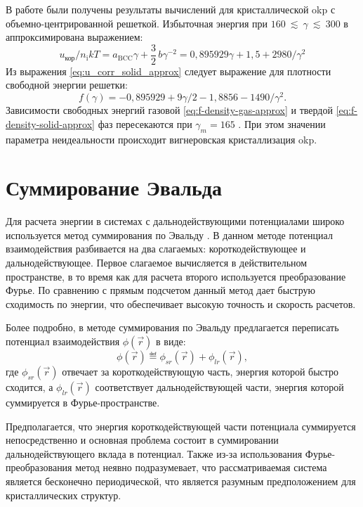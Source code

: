 В работе \cite{Slattery:u_corr_approximation} были получены результаты вычислений для кристаллической \acrshort{okp} с объемно-центрированной решеткой. Избыточная энергия при $160~\lesssim~\gamma~\lesssim~300$ в \cite{Slattery:u_corr_approximation} аппроксимирована выражением:
\begin{equation}
    \label{eq:u_corr_solid_approx}
    u_{\text{кор}} / n_{\mathrm{i}} k T=a_{\mathrm{BCC}} \gamma+\frac{3}{2}\, b \gamma^{-2}=0,895929 \gamma+1,5+2980 / \gamma^{2}
\end{equation}
Из выражения \eqref{eq:u_corr_solid_approx} следует выражение для плотности свободной энергии решетки:
\begin{equation}
    \label{eq:f-density-solid-approx}
    f(\gamma)=-0,895929+9 \gamma / 2-1,8856-1490 / \gamma^{2}.
\end{equation}
Зависимости свободных энергий газовой \eqref{eq:f-density-gas-approx} и твердой \eqref{eq:f-density-solid-approx} фаз пересекаются при $\gamma_m = 165$ \cite{Slattery:u_corr_approximation}.
При этом значении параметра неидеальности происходит вигнеровская кристаллизация \acrshort{okp}.

\section{Суммирование Эвальда}
\label{sec:ewald}
Для расчета энергии в системах с дальнодействующими потенциалами широко используется метод суммирования по Эвальду \cite{ewald:summation_original}.
В данном методе потенциал взаимодействия разбивается на два слагаемых: короткодействующее и дальнодействующее.
Первое слагаемое вычисляется в действительном пространстве, в то время как для расчета второго используется преобразование Фурье.
По сравнению с прямым подсчетом данный метод дает быструю сходимость по энергии, что обеспечивает высокую точность и скорость расчетов.

Более подробно, в методе суммирования по Эвальду предлагается переписать потенциал взаимодействия $\phi(\vec{r})$ в виде:
\begin{equation}
    \label{eq:ewald:potention_def}
    \phi(\vec{r}) \eqdef \phi_{sr}(\vec{r})+\phi_{lr}(\vec{r}),
\end{equation}
где $\phi_{sr}(\vec{r})$ отвечает за короткодействующую часть, энергия которой быстро сходится, а $\phi_{lr}(\vec{r})$ соответствует дальнодействующей части, энергия которой суммируется в Фурье-пространстве.

Предполагается, что энергия короткодействующей части потенциала суммируется непосредственно и основная проблема состоит в суммировании дальнодействующего вклада в потенциал.
Также из-за использования Фурье-преобразования метод неявно подразумевает, что рассматриваемая система является бесконечно периодической, что является разумным предположением для кристаллических структур.

